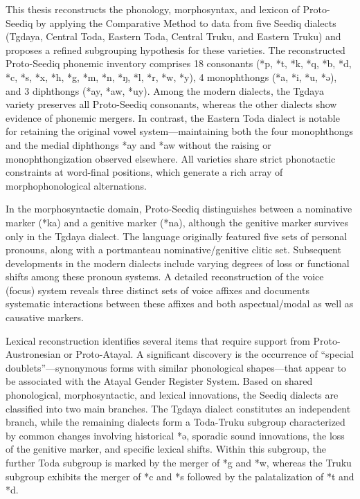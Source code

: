 This thesis reconstructs the phonology, morphosyntax, and lexicon of Proto-Seediq by applying the Comparative Method to data from five Seediq dialects (Tgdaya, Central Toda, Eastern Toda, Central Truku, and Eastern Truku) and proposes a refined subgrouping hypothesis for these varieties. The reconstructed Proto-Seediq phonemic inventory comprises 18 consonants (*p, *t, *k, *q, *b, *d, *c, *s, *x, *h, *g, *m, *n, *ŋ, *l, *r, *w, *y), 4 monophthongs (*a, *i, *u, *ə), and 3 diphthongs (*ay, *aw, *uy). Among the modern dialects, the Tgdaya variety preserves all Proto-Seediq consonants, whereas the other dialects show evidence of phonemic mergers. In contrast, the Eastern Toda dialect is notable for retaining the original vowel system—maintaining both the four monophthongs and the medial diphthongs *ay and *aw without the raising or monophthongization observed elsewhere. All varieties share strict phonotactic constraints at word-final positions, which generate a rich array of morphophonological alternations.

In the morphosyntactic domain, Proto-Seediq distinguishes between a nominative marker (*ka) and a genitive marker (*na), although the genitive marker survives only in the Tgdaya dialect. The language originally featured five sets of personal pronouns, along with a portmanteau nominative/genitive clitic set. Subsequent developments in the modern dialects include varying degrees of loss or functional shifts among these pronoun systems. A detailed reconstruction of the voice (focus) system reveals three distinct sets of voice affixes and documents systematic interactions between these affixes and both aspectual/modal as well as causative markers.

Lexical reconstruction identifies several items that require support from Proto-Austronesian or Proto-Atayal. A significant discovery is the occurrence of “special doublets”—synonymous forms with similar phonological shapes—that appear to be associated with the Atayal Gender Register System. Based on shared phonological, morphosyntactic, and lexical innovations, the Seediq dialects are classified into two main branches. The Tgdaya dialect constitutes an independent branch, while the remaining dialects form a Toda-Truku subgroup characterized by common changes involving historical *ə, sporadic sound innovations, the loss of the genitive marker, and specific lexical shifts. Within this subgroup, the further Toda subgroup is marked by the merger of *g and *w, whereas the Truku subgroup exhibits the merger of *c and *s followed by the palatalization of *t and *d.






